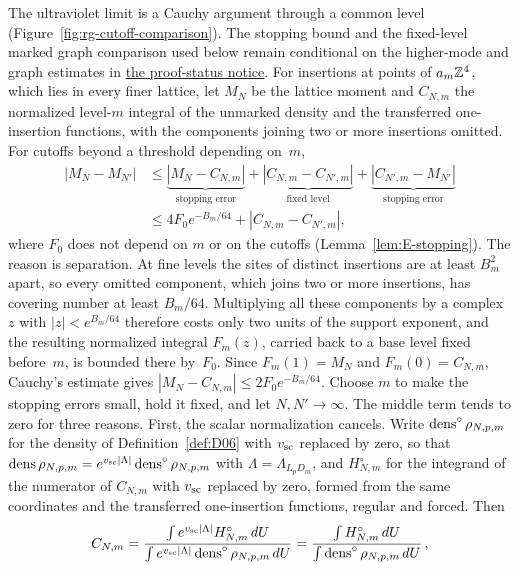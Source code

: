 The ultraviolet limit is a Cauchy argument through a common level (Figure~\ref{fig:rg-cutoff-comparison}). The stopping bound and the fixed-level marked graph comparison used below remain conditional on the higher-mode and graph estimates in \hyperref[par:proof-status]{the proof-status notice}. For insertions at points of $a_m\mathbb{Z}^4$, which lies in every finer lattice, let $M_N$ be the lattice moment and $C_{N,m}$ the normalized level-$m$ integral of the unmarked density and the transferred one-insertion functions, with the components joining two or more insertions omitted. For cutoffs beyond a threshold depending on~$m$,
\begin{align*}
|M_N-M_{N'}|&\le
\underbrace{|M_N-C_{N,m}|}_{\text{stopping error}}
+\underbrace{|C_{N,m}-C_{N',m}|}_{\text{fixed level}}
+\underbrace{|C_{N',m}-M_{N'}|}_{\text{stopping error}}\\
&\le4F_0e^{-B_m/64}+|C_{N,m}-C_{N',m}|,
\end{align*}
where $F_0$ does not depend on $m$ or on the cutoffs (Lemma~\ref{lem:E-stopping}). The reason is separation. At fine levels the sites of distinct insertions are at least $B_m^2$ apart, so every omitted component, which joins two or more insertions, has covering number at least $B_m/64$. Multiplying all these components by a complex~$z$ with $|z|<e^{B_m/64}$ therefore costs only two units of the support exponent, and the resulting normalized integral $F_m(z)$, carried back to a base level fixed before~$m$, is bounded there by~$F_0$. Since $F_m(1)=M_N$ and $F_m(0)=C_{N,m}$, Cauchy's estimate gives $|M_N-C_{N,m}|\le2F_0e^{-B_m/64}$. Choose $m$ to make the stopping errors small, hold it fixed, and let $N,N'\to\infty$. The middle term tends to zero for three reasons. First, the scalar normalization cancels. Write $\operatorname{dens}^\circ\rho_{N,p,m}$ for the density of Definition~\ref{def:D06} with $v_{\rm sc}$ replaced by zero, so that $\operatorname{dens}\rho_{N,p,m}=e^{v_{\rm sc}|\Lambda|}\operatorname{dens}^\circ\rho_{N,p,m}$ with $\Lambda=\Lambda_{L_pD_m}$, and $H^\circ_{N,m}$ for the integrand of the numerator of $C_{N,m}$ with $v_{\rm sc}$ replaced by zero, formed from the same coordinates and the transferred one-insertion functions, regular and forced. Then
\begin{equation*}
C_{N,m}=\frac{\int e^{v_{\rm sc}|\Lambda|}H^\circ_{N,m}\,dU}{\int e^{v_{\rm sc}|\Lambda|}\operatorname{dens}^\circ\rho_{N,p,m}\,dU}
=\frac{\int H^\circ_{N,m}\,dU}{\int\operatorname{dens}^\circ\rho_{N,p,m}\,dU}\,,
\end{equation*}
